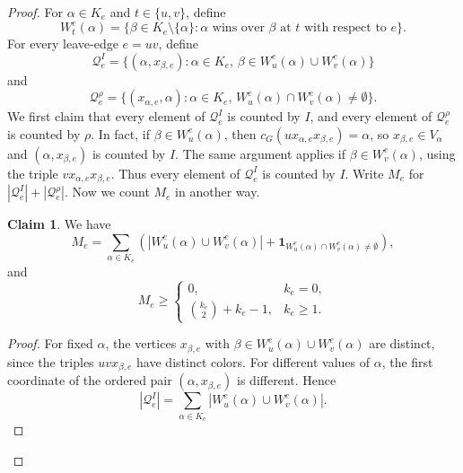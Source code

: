 \documentclass[10pt,a4paper]{article}
\theoremstyle{definition}
\newtheorem{claim}[theorem]{Claim}
\begin{document}
\begin{proof}
    For $\alpha\in K_e$ and $t\in\{u,v\}$, define
    \[
        W_t^e(\alpha)
        =
        \{\beta\in K_e\setminus\{\alpha\}:
        \alpha \text{ wins over } \beta \text{ at } t \text{ with respect to } e\}.
    \]
    For every leave-edge $e=uv$, define
    \[
        \mathcal Q_e^I
        =
        \{(\alpha,x_{\beta,e}):
        \alpha\in K_e,\,
        \beta\in W_u^e(\alpha)\cup W_v^e(\alpha)\}
    \]
    and
    \[
        \mathcal Q_e^\rho
        =
        \{(x_{\alpha,e},\alpha):
        \alpha\in K_e,\,
        W_u^e(\alpha)\cap W_v^e(\alpha)\neq\emptyset\}.
    \]
    We first claim that every element of $\mathcal Q_e^I$ is counted by $I$, and every element of $\mathcal Q_e^\rho$ is counted by $\rho$.
    In fact, if $\beta\in W_u^e(\alpha)$, then $c_G(ux_{\alpha,e}x_{\beta,e})=\alpha$, so $x_{\beta,e}\in V_\alpha$ and $(\alpha,x_{\beta,e})$ is counted by $I$.
    The same argument applies if $\beta\in W_v^e(\alpha)$, using
    the triple $vx_{\alpha,e}x_{\beta,e}$.  Thus every element of
    $\mathcal Q_e^I$ is counted by $I$.
    Write $M_e$ for $|\mathcal Q_e^I|+|\mathcal Q_e^\rho|$.
    Now we count $M_e$ in another way.
    \begin{claim}\label{clm:bad-winner-contribution-new}
        We have
        \begin{equation}\label{eq:Me-def}
            M_e=
            \sum_{\alpha\in K_e}
            \left(
            |W_u^e(\alpha)\cup W_v^e(\alpha)|
            +
            \mathbf 1_{W_u^e(\alpha)\cap W_v^e(\alpha)\neq\emptyset}
            \right),
        \end{equation}
        and
        \begin{equation}\label{eq:Me-lower}
            M_e\ge
            \begin{cases}
                0,                    & k_e=0,   \\
                \binom{k_e}{2}+k_e-1, & k_e\ge1.
            \end{cases}
        \end{equation}
    \end{claim}
    \begin{proof}
        For fixed $\alpha$, the vertices $x_{\beta,e}$ with
        $\beta\in W_u^e(\alpha)\cup W_v^e(\alpha)$ are distinct, since the
        triples $uvx_{\beta,e}$ have distinct colors.  For different values
        of $\alpha$, the first coordinate of the ordered pair
        $(\alpha,x_{\beta,e})$ is different.  Hence
        \[
            |\mathcal Q_e^I|
            =
            \sum_{\alpha\in K_e}|W_u^e(\alpha)\cup W_v^e(\alpha)|.
        \]


\end{proof}
\end{proof}
\end{document}
